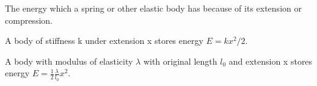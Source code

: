  The energy which a spring or other elastic body has because
of its extension or compression.
\par
A body of stiffness k under extension x stores
energy $E=kx^{2}/2.$ 
\par
A body with modulus of elasticity $ \lambda $ with original length $l_{0}$  and extension x stores energy  
$ E = \frac{1}{2} \frac{ \lambda }{l_0} x ^2 . $
